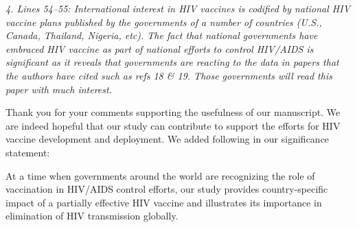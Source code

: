\documentclass[12pt]{jpmletter}
\newenvironment{original}{\it}{}
\begin{document}
\begin{letter}{}
    \begin{original}
      4. Lines 54–55: International interest in HIV vaccines is
      codified by national HIV vaccine plans published by the
      governments of a number of countries (U.S., Canada, Thailand,
      Nigeria, etc). The fact that national governments have embraced
      HIV vaccine as part of national efforts to control HIV/AIDS is
      significant as it reveals that governments are reacting to the
      data in papers that the authors have cited such as refs 18 \&
      19. Those governments will read this paper with much interest.
    \end{original}
    
    Thank you for your comments supporting the usefulness of our
    manuscript. We are indeed hopeful that our study can contribute to
    support the efforts for HIV vaccine development and deployment. We
    added following in our significance statement:
    \begin{quoting}
      At a time when governments around the world are recognizing the
      role of vaccination in HIV/AIDS control efforts, our study
      provides country-specific impact of a partially effective HIV
      vaccine and illustrates its importance in elimination of HIV
      transmission globally.
    \end{quoting}
    
  \end{letter}
\end{document}
